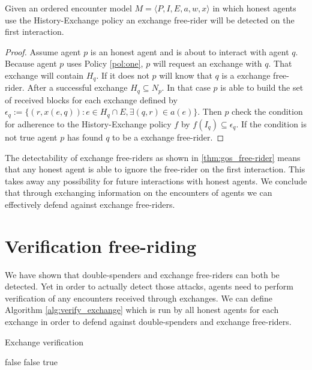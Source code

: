 \begin{thm}
    \label{thm:gos_free-rider}
    Given an ordered encounter model $M = \langle P, I, E, a, w, x \rangle$ in which honest agents use the History-Exchange policy
    an exchange free-rider will be detected on the first interaction.
\end{thm}
\begin{proof}
    Assume agent $p$ is an honest agent and is about to interact with agent $q$. Because agent $p$
    uses Policy \ref{pol:one}, $p$ will request an exchange with $q$. That exchange will contain 
    $H_q$. If it does not $p$ will know that $q$ is a exchange free-rider. After a successful
    exchange $H_q \subseteq N_p$. In that case $p$ is able to build the set of received blocks for 
    each exchange defined by $\epsilon_q := \{ (r, x(e, q)) : e \in H_q \cap E,  \exists (q, r) \in a(e)\}$. Then $p$ check the condition for adherence to 
    the History-Exchange policy $f$ by $f(I_q) \subseteq \epsilon_q$. If the condition is not true agent $p$ has found $q$ to be a
    exchange free-rider.
\end{proof}

The detectability of exchange free-riders as shown in \ref{thm:gos_free-rider} means that any 
honest agent is able to ignore the free-rider on the first interaction. This takes away any 
possibility for future interactions with honest agents. We conclude that through exchanging
information on the encounters of agents we can effectively defend against 
exchange free-riders.

\section{Verification free-riding}
\label{sec:verification_free-riding}
We have shown that double-spenders and exchange free-riders can both be detected. Yet in order to 
actually detect those attacks, agents need to perform verification of any encounters received 
through exchanges. We can define Algorithm \ref{alg:verify_exchange} which is run by all 
honest agents for each exchange in order to defend against double-spenders and exchange free-riders.

\begin{algorithm}
\caption{Exchange verification}\label{alg:verify_exchange}
\begin{algorithmic}[1]
 \Return false
\EndIf
\EndFor
{}
 \Return false
\EndIf
\EndFor
\Return true
\EndProcedure
\end{algorithmic}
\end{algorithm}

